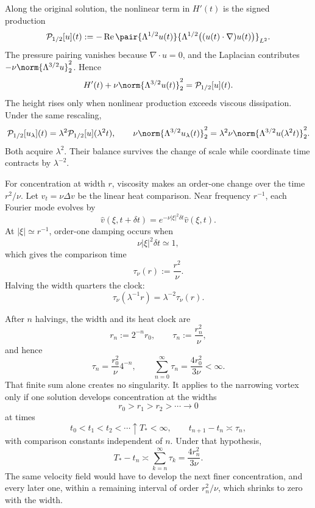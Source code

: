 Along the original solution, the nonlinear term in \(H'(t)\) is the signed production
\[
  \mathcal P_{1/2}[u](t)
  :=
  -\operatorname{Re}
  \pair
    {\Lambda^{1/2}u(t)}
    {\Lambda^{1/2}\bigl((u(t)\cdot\nabla)u(t)\bigr)}_{L^2}.
\]
The pressure pairing vanishes because \(\nabla\cdot u=0\), and the Laplacian contributes \(-\nu\norm{\Lambda^{3/2}u}_2^2\). Hence
\[
  H'(t)
  +
  \nu\norm{\Lambda^{3/2}u(t)}_2^2
  =
  \mathcal P_{1/2}[u](t).
\]
The height rises only when nonlinear production exceeds viscous dissipation. Under the same rescaling,
\[
  \mathcal P_{1/2}[u_\lambda](t)
  =
  \lambda^2\mathcal P_{1/2}[u](\lambda^2t),
  \qquad
  \nu\norm{\Lambda^{3/2}u_\lambda(t)}_2^2
  =
  \lambda^2\nu\norm{\Lambda^{3/2}u(\lambda^2t)}_2^2.
\]
Both acquire \(\lambda^2\). Their balance survives the change of scale while coordinate time contracts by \(\lambda^{-2}\).


For concentration at width \(r\), viscosity makes an order-one change over the time \(r^2/\nu\). Let \(v_t=\nu\Delta v\) be the linear heat comparison. Near frequency \(r^{-1}\), each Fourier mode evolves by
\[
  \widehat v(\xi,t+\delta t)
  =
  e^{-\nu|\xi|^2\delta t}\widehat v(\xi,t).
\]
At \(|\xi|\simeq r^{-1}\), order-one damping occurs when
\[
  \nu|\xi|^2\delta t\simeq1,
\]
which gives the comparison time
\[
  \tau_\nu(r)
  :=
  \frac{r^2}{\nu}.
\]
Halving the width quarters the clock:
\[
  \tau_\nu(\lambda^{-1}r)
  =
  \lambda^{-2}\tau_\nu(r).
\]


After \(n\) halvings, the width and its heat clock are
\[
  r_n:=2^{-n}r_0,
  \qquad
  \tau_n:=\frac{r_n^2}{\nu},
\]
and hence
\[
  \tau_n
  =
  \frac{r_0^2}{\nu}4^{-n},
  \qquad
  \sum_{n=0}^{\infty}\tau_n
  =
  \frac{4r_0^2}{3\nu}
  <
  \infty.
\]
That finite sum alone creates no singularity. It applies to the narrowing vortex only if one \NavierStokes{} solution develops concentration at the widths
\[
  r_0>r_1>r_2>\cdots\longrightarrow0
\]
at times
\[
  t_0<t_1<t_2<\cdots\uparrow T_*<\infty,
  \qquad
  t_{n+1}-t_n\asymp\tau_n,
\]
with comparison constants independent of \(n\). Under that hypothesis,
\[
  T_*-t_n
  \asymp
  \sum_{k=n}^{\infty}\tau_k
  =
  \frac{4r_n^2}{3\nu}.
\]
The same velocity field would have to develop the next finer concentration, and every later one, within a remaining interval of order \(r_n^2/\nu\), which shrinks to zero with the width.

